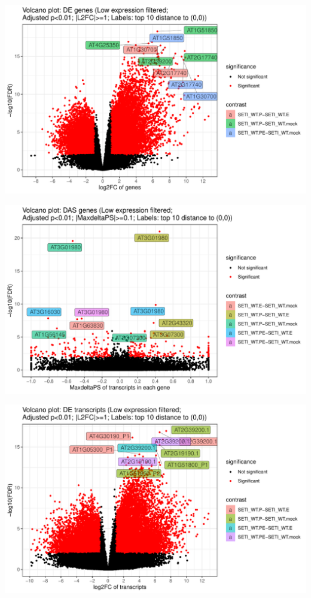 \documentclass[]{article}
\begin{document}
\includegraphics[width=16.67in]{X2024.08.05.11.24.04.j284/figure/DE genes volcano plot}

\includegraphics[width=16.67in]{X2024.08.05.11.24.04.j284/figure/DAS genes volcano plot}

\includegraphics[width=16.67in]{X2024.08.05.11.24.04.j284/figure/DE transcripts volcano plot}
\end{document}
